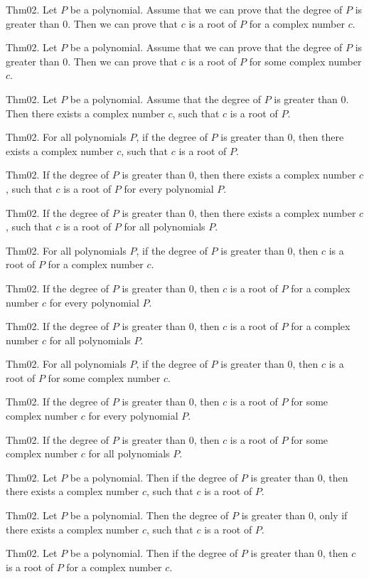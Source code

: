 \documentclass{article}
\begin{document}
Thm02. Let $P$ be a polynomial. Assume that we can prove that the degree of $P$ is greater than $0$. Then we can prove that $c$ is a root of $P$ for a complex number $c$.

Thm02. Let $P$ be a polynomial. Assume that we can prove that the degree of $P$ is greater than $0$. Then we can prove that $c$ is a root of $P$ for some complex number $c$.

Thm02. Let $P$ be a polynomial. Assume that the degree of $P$ is greater than $0$. Then there exists a complex number $c$, such that $c$ is a root of $P$.

Thm02. For all polynomials $P$, if the degree of $P$ is greater than $0$, then there exists a complex number $c$, such that $c$ is a root of $P$.

Thm02. If the degree of $P$ is greater than $0$, then there exists a complex number $c$, such that $c$ is a root of $P$ for every polynomial $P$.

Thm02. If the degree of $P$ is greater than $0$, then there exists a complex number $c$, such that $c$ is a root of $P$ for all polynomials $P$.

Thm02. For all polynomials $P$, if the degree of $P$ is greater than $0$, then $c$ is a root of $P$ for a complex number $c$.

Thm02. If the degree of $P$ is greater than $0$, then $c$ is a root of $P$ for a complex number $c$ for every polynomial $P$.

Thm02. If the degree of $P$ is greater than $0$, then $c$ is a root of $P$ for a complex number $c$ for all polynomials $P$.

Thm02. For all polynomials $P$, if the degree of $P$ is greater than $0$, then $c$ is a root of $P$ for some complex number $c$.

Thm02. If the degree of $P$ is greater than $0$, then $c$ is a root of $P$ for some complex number $c$ for every polynomial $P$.

Thm02. If the degree of $P$ is greater than $0$, then $c$ is a root of $P$ for some complex number $c$ for all polynomials $P$.

Thm02. Let $P$ be a polynomial. Then if the degree of $P$ is greater than $0$, then there exists a complex number $c$, such that $c$ is a root of $P$.

Thm02. Let $P$ be a polynomial. Then the degree of $P$ is greater than $0$, only if there exists a complex number $c$, such that $c$ is a root of $P$.

Thm02. Let $P$ be a polynomial. Then if the degree of $P$ is greater than $0$, then $c$ is a root of $P$ for a complex number $c$.
\end{document}

